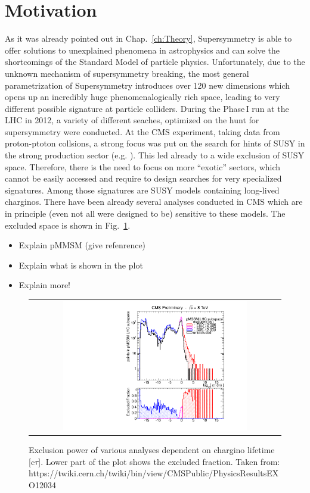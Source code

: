 \section{Motivation}
\label{sec:Motivation}
As it was already pointed out in Chap.~\ref{ch:Theory}, Supersymmetry is able to offer solutions to unexplained phenomena in astrophysics and can solve the shortcomings of the Standard Model of particle physics.
Unfortunately, due to the unknown mechanism of supersymmetry breaking, the most general parametrization of Supersymmetry introduces over 120 new dimensions which opens up an incredibly huge phenomenalogically rich space, 
leading to very different possible signature at particle colliders. 
During the Phase\,I run at the LHC in 2012, a variety of different seaches, optimized on the hunt for supersymmetry were conducted.
At the CMS experiment, taking data from proton-ptoton collsions, a strong focus was put on the search for hints of SUSY in the strong production sector (e.g. \cite{}).
This led already to a wide exclusion of SUSY space. 
Therefore, there is the need to focus on more ``exotic'' sectors, which cannot be easily accessed and require to design searches for very specialized signatures.
Among those signatures are SUSY models containing long-lived charginos. 
There have been already several analyses conducted in CMS which are in principle (even not all were designed to be) sensitive to these models.
The excluded space is shown in Fig.~\ref{fig:pMSSMplot}. 
\begin{itemize}
\item Explain pMMSM (give refenrence)
\item Explain what is shown in the plot
\item Explain more!
\end{itemize}

\begin{figure}[!ht]
  \centering 
  \begin{tabular}{c}
    \includegraphics[width=0.75\textwidth]{figures/analysis/pMSSM_vs_ctau.pdf}
  \end{tabular}
  \caption{Exclusion power of various analyses dependent on chargino lifetime [c$\tau$]. Lower part of the plot shows the excluded fraction. Taken from: https://twiki.cern.ch/twiki/bin/view/CMSPublic/PhysicsResultsEXO12034}
  \label{fig:pMSSMplot}
\end{figure}

